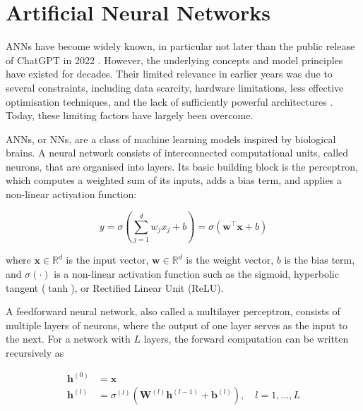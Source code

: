 
\section{Artificial Neural Networks}
\label{sec:anns}
\ac{ANN}s have become widely known, in particular not later than the public release of ChatGPT in 2022 \cite{openai_introducing_2024}. However, the underlying concepts and model principles have existed for decades. Their limited relevance in earlier years was due to several constraints, including data scarcity, hardware limitations, less effective optimisation techniques, and the lack of sufficiently powerful architectures \cite{wu_ai_2025}. Today, these limiting factors have largely been overcome.

\ac{ANN}s, or \ac{NN}s, are a class of machine learning models inspired by biological brains. A neural network consists of interconnected computational units, called neurons, that are organised into layers. Its basic building block is the perceptron, which computes a weighted sum of its inputs, adds a bias term, and applies a non-linear activation function:

\begin{equation}
  y = \sigma \left( \sum_{j=1}^{d} w_j x_j + b \right) = \sigma(\mathbf{w}^{\top} \mathbf{x} + b)
  \label{eq:perceptron}
\end{equation}

where $\mathbf{x} \in \mathbb{R}^{d}$ is the input vector, $\mathbf{w} \in \mathbb{R}^{d}$ is the weight vector, $b$ is the bias term, and $\sigma(\cdot)$ is a non-linear activation function such as the sigmoid, hyperbolic tangent ($\tanh$), or Rectified Linear Unit (ReLU).

A feedforward neural network, also called a multilayer perceptron, consists of multiple layers of neurons, where the output of one layer serves as the input to the next. For a network with $L$ layers, the forward computation can be written recursively as

\begin{align}
  \mathbf{h}^{(0)} &= \mathbf{x} \\
  \mathbf{h}^{(l)} &= \sigma^{(l)} \left( \mathbf{W}^{(l)} \mathbf{h}^{(l-1)} + \mathbf{b}^{(l)} \right), \quad l = 1, \ldots, L
  \label{eq:feedforward-network}
\end{align}

